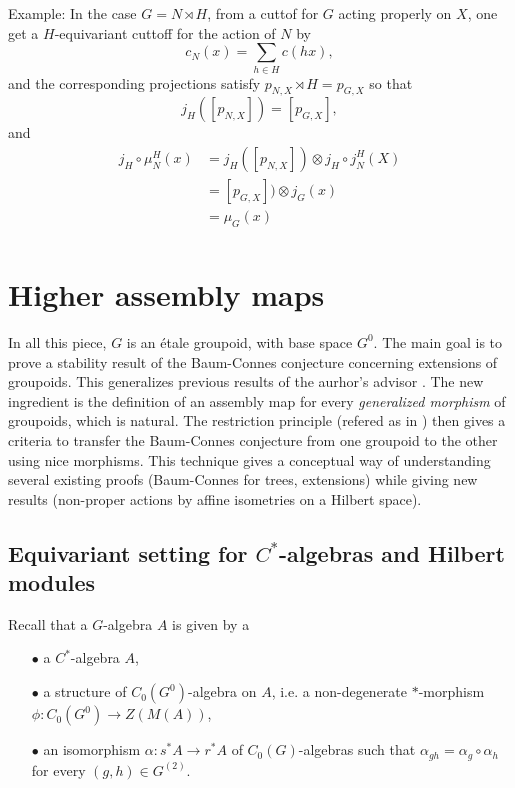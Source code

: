 Example: In the case $G=N\rtimes H$, from a cuttof for $G$ acting properly on $X$, one get a $H$-equivariant cuttoff for the action of $N$ by 
\[c_N (x) =\sum_{h\in H} c(hx),\]
and the corresponding projections satisfy $p_{N,X} \rtimes H = p_{G,X}$ so that 
\[ j_H([p_{N,X}]) = [p_{G,X}],\]
and
\[\begin{split}
j_H \circ\mu_N^H(x) & = j_H([p_{N,X}]) \otimes j_H\circ j^H_N(X) \\
			& = [p_{G,X}]) \otimes j_G(x)\\
			&= \mu_G(x)\\
\end{split}\]
\newpage

\section{Higher assembly maps}

In all this piece, $G$ is an \'etale groupoid, with base space $G^0$. The main goal is to prove a stability result of the Baum-Connes conjecture concerning extensions of groupoids. This generalizes previous results of the aurhor's advisor \cite{}. The new ingredient is the definition of an assembly map for every \textit{generalized morphism} of groupoids, which is natural. The restriction principle (refered as  in \cite{CEO)}) then gives a criteria to transfer the Baum-Connes conjecture from one groupoid to the other using nice morphisms. This technique gives a conceptual way of understanding several existing proofs (Baum-Connes for trees, extensions) while giving new results (non-proper actions by affine isometries on a Hilbert space).
 
\subsection{Equivariant setting for $C^*$-algebras and Hilbert modules}
Recall that a $G$-algebra $A$ is given by a 
\begin{itemize}
\item[$\bullet$] a $C^*$-algebra $A$, 
\item[$\bullet$] a structure of $C_0(G^0)$-algebra on $A$, i.e. a non-degenerate $*$-morphism $\phi : C_0(G^0)\rightarrow Z(M(A)) $,
\item[$\bullet$] an isomorphism $\alpha: s^* A \rightarrow r^* A$ of $C_0(G)$-algebras such that $\alpha_{gh} = \alpha_g \circ \alpha_h$ for every $(g,h)\in G^{(2)}$.
\end{itemize} 

